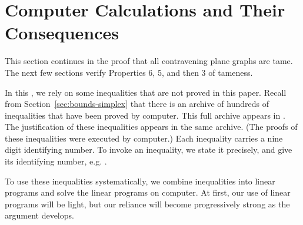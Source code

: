 \section{Computer Calculations and Their Consequences}

This section continues in the proof that all contravening plane
graphs are tame.  The next few sections verify Properties 6, 5,
and then 3 of tameness.

In this \chap, we  rely on some inequalities that are not proved
in this paper.  Recall from Section~\ref{sec:bounds-simplex} that
there is an archive of hundreds of inequalities that have been
proved by computer. This full archive appears in \cite{web}.  The
justification of these inequalities appears in the same archive.
(The proofs of these inequalities were executed by computer.) Each
inequality carries a nine digit identifying number.  To invoke an
inequality, we state it precisely, and give its identifying
number, e.g. .


To use these inequalities systematically, we combine inequalities
into linear programs and solve the linear programs on computer. At
first, our use of linear programs will be light, but our reliance
will become progressively strong as the argument develops.

